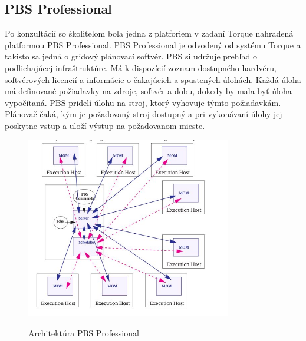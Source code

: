 \documentclass[printed,11pt,twoside,color,cover,table]{fithesis3}
\begin{document}
\subsection{PBS Professional}
Po konzultácií so školiteľom bola jedna z platforiem v zadaní Torque nahradená platformou PBS Professional\footnotemark{}\cite{pbs_pro}. PBS Professional je odvodený od 
systému Torque a takisto sa jedná o gridový plánovací softvér. PBS si udržuje prehľad o podliehajúcej infraštruktúre. Má k dispozícií zoznam dostupného hardvéru, softvérových licencií a informácie o
čakajúcich a spustených úlohách. Každá úloha má definované požiadavky na zdroje, softvér a dobu, dokedy by mala byť úloha vypočítaná. PBS pridelí úlohu
na stroj, ktorý vyhovuje týmto požiadavkám. Plánovač čaká, kým je požadovaný stroj dostupný a pri vykonávaní úlohy jej poskytne vstup a uloží výstup na požadovanom mieste.
\begin{figure}
\begin{center}
       \includegraphics[width=0.8\textwidth]{images/pbspro-arch.jpg}
       \caption{Architektúra PBS Professional}\cite{pbs_pro_arch}
\end{center}
\end{figure}
\end{document}
